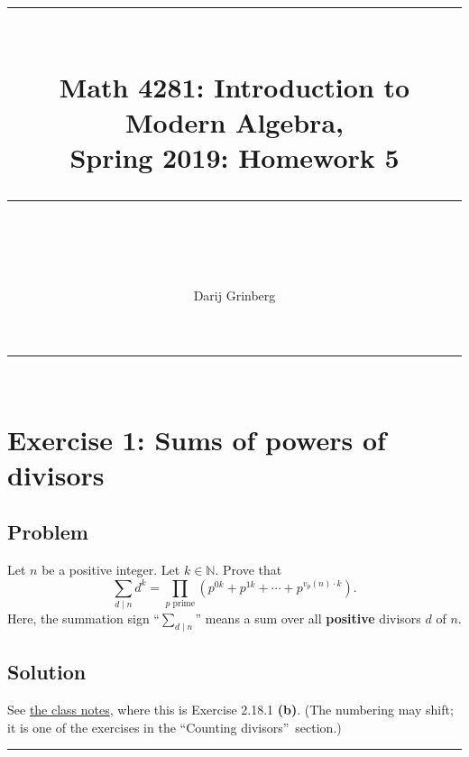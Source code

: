 \documentclass[paper=a4, fontsize=12pt]{scrartcl}%
\let\sumnonlimits\sum
\let\prodnonlimits\prod
\renewcommand{\sum}{\sumnonlimits\limits}
\renewcommand{\prod}{\prodnonlimits\limits}
\theoremstyle{plainsl}
\theoremstyle{definition}
\theoremstyle{remark}
\begin{document}
\title{ \\[25pt] \rule{\linewidth}{0.5pt} \\[0.4cm] {\huge Math 4281: Introduction to Modern Algebra, }\\Spring 2019: Homework 5\\\rule{\linewidth}{2pt} \\[0.5cm] }
\author{Darij Grinberg}
\maketitle

\rule{\linewidth}{0.3pt} \\[0.4cm]

\section{Exercise 1: Sums of powers of divisors}

\subsection{Problem}

Let $n$ be a positive integer. Let $k \in\mathbb{N}$. Prove that
\[
\sum_{d \mid n} d^{k} = \prod_{p \text{ prime}} \left(  p^{0k} + p^{1k} +
\cdots+ p^{v_{p}\left(  n \right)  \cdot k} \right)  .
\]
Here, the summation sign ``$\sum_{d \mid n}$'' means a sum over all
\textbf{positive} divisors $d$ of $n$.

\subsection{Solution}

See \href{http://www.cip.ifi.lmu.de/~grinberg/t/19s/notes.pdf}{the class
notes}, where this is Exercise 2.18.1 \textbf{(b)}. (The numbering may shift;
it is one of the exercises in the \textquotedblleft Counting
divisors\textquotedblright\ section.)

\rule{\linewidth}{0.3pt} \\[0.4cm]
\end{document}
